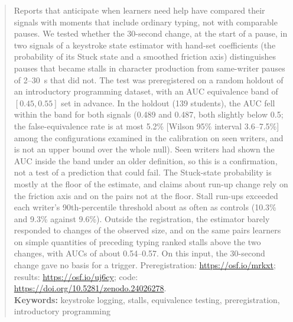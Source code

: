 \begin{abstract}
Reports that anticipate when learners need help have compared their signals with moments that include ordinary typing,
not with comparable pauses. We tested whether the 30-second change, at the start of a pause, in two signals of a keystroke state
estimator with hand-set coefficients (the probability of its Stuck state and a smoothed friction axis) distinguishes
pauses that became stalls in character production from same-writer pauses of 2--30~s that did not. The test was
preregistered on a random holdout of an introductory programming dataset, with an AUC equivalence band of
$[0.45, 0.55]$ set in advance. In the holdout (139 students), the AUC fell within the band for both signals (0.489 and
0.487, both slightly below 0.5; the false-equivalence rate is at most 5.2\% [Wilson 95\% interval 3.6--7.5\%] among the
configurations examined in the calibration on seen writers, and is not an upper bound over the whole null). Seen
writers had shown the AUC inside the band under an older definition, so this is a confirmation, not a test of a
prediction that could fail. The Stuck-state probability is mostly at the floor of the estimate, and claims about run-up
change rely on the friction axis and on the pairs not at the floor. Stall run-ups exceeded each writer's 90th-percentile
threshold about as often as controls (10.3\% and 9.3\% against 9.6\%). Outside the registration, the estimator barely responded to changes of the
observed size, and on the same pairs learners on simple quantities of preceding typing ranked stalls above the two
changes, with AUCs of about 0.54--0.57. On this input, the 30-second change gave no basis for a trigger. Preregistration: \url{https://osf.io/mrkxt}; results:
\url{https://osf.io/uj6cy}; code: \url{https://doi.org/10.5281/zenodo.24026278}.\\

{\parindent0pt
\textbf{Keywords:} keystroke logging, stalls, equivalence testing, preregistration, introductory programming
}
\end{abstract}
